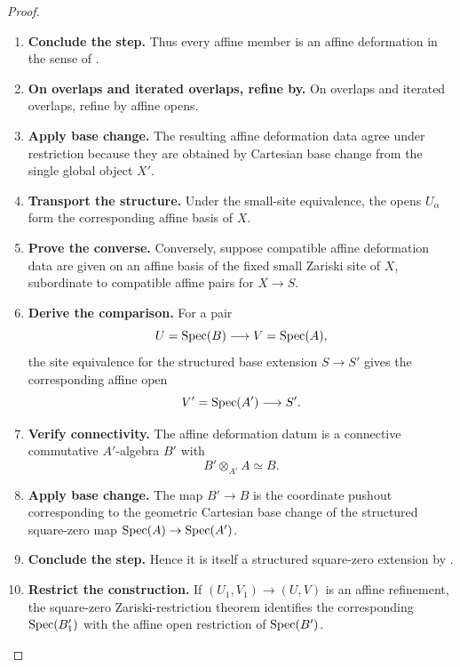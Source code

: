 \begin{proof}
\begin{enumerate}[label=\textup{(\arabic*)}]
    \item \textbf{Conclude the step.}
    Thus every affine member is an affine deformation in the sense of
    .

    \item \textbf{On overlaps and iterated overlaps, refine by.}
    On overlaps and iterated overlaps, refine by affine opens.

    \item \textbf{Apply base change.}
    The resulting affine deformation data agree under restriction because they are obtained by
    Cartesian base change from the single global object \(X'\).

    \item \textbf{Transport the structure.}
    Under the small-site equivalence, the opens \(U_\alpha\) form the corresponding affine basis
    of \(X\).

    \item \textbf{Prove the converse.}
    Conversely, suppose compatible affine deformation data are given on an affine basis of the
    fixed small Zariski site of \(X\), subordinate to compatible affine pairs for
    \(X\to S\).

    \item \textbf{Derive the comparison.}
    For a pair
    \[
        U=\operatorname{Spec}(B)\longrightarrow V=\operatorname{Spec}(A),
    \]
    the site equivalence for the structured base extension \(S\to S'\) gives the corresponding
    affine open
    \[
        V'=\operatorname{Spec}(A')\longrightarrow S'.
    \]

    \item \textbf{Verify connectivity.}
    The affine deformation datum is a connective commutative \(A'\)-algebra \(B'\)
    with
    \[
        B'\otimes_{A'}A\simeq B.
    \]

    \item \textbf{Apply base change.}
    The map \(B'\to B\) is the coordinate pushout corresponding to the geometric Cartesian base
    change of the structured square-zero map \(\operatorname{Spec}(A)\to\operatorname{Spec}(A')\).

    \item \textbf{Conclude the step.}
    Hence it is itself a structured square-zero extension by
    .

    \item \textbf{Restrict the construction.}
    If \((U_1,V_1)\to(U,V)\) is an affine refinement, the square-zero Zariski-restriction theorem
     identifies the corresponding \(\operatorname{Spec}(B'_1)\)
    with the affine open restriction of \(\operatorname{Spec}(B')\).


\end{enumerate}
\end{proof}
